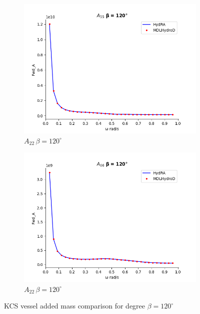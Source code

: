 \begin{figure}[H]
\begin{subfigure}[b]{0.45\textwidth}
        \includegraphics[width=\textwidth]{plots/kcs/added_mass_deg=120/a55.png}
        \caption{$A_{22} \, \beta = 120^{\circ}$}
    \end{subfigure}
    \begin{subfigure}[b]{0.45\textwidth}
        \includegraphics[width=\textwidth]{plots/kcs/added_mass_deg=120/a66.png}
        \caption{$A_{22} \, \beta = 120^{\circ}$}
    \end{subfigure}
    \caption{KCS vessel added mass comparison for degree $\beta=120^{\circ}$}
    \label{fig:kcs_addedmass_1}
\end{figure}

